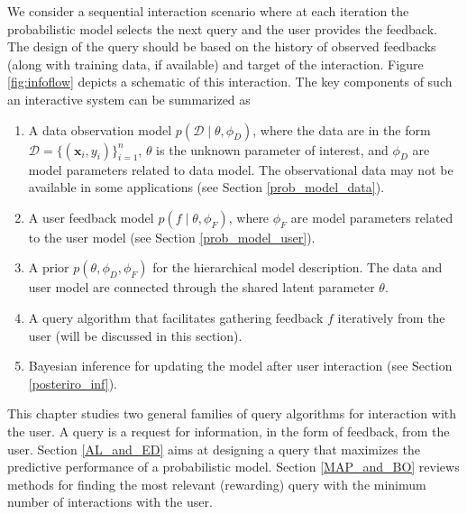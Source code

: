 \documentclass[dissertation,math,vertlayout,pdfa,colorlinks]{aaltoseries}
\newcommand{\bD}{\mathcal{D}}
\begin{document}
We consider a sequential interaction scenario where at each iteration the probabilistic model selects the next query and the user provides the feedback. The design of the query should be based on the history of observed feedbacks (along with training data, if available) and target of the interaction. Figure \ref{fig:infoflow} depicts a schematic of this interaction. The key components of such an interactive system can be summarized as

\begin{enumerate}
	\item A data observation model $p(\bD \mid \! \theta,\phi_D)$, where the data are in the form $\bD= \{(\bm{x}_i,y_i)\}_{i=1}^{n}$, $\theta$ is the unknown parameter of interest, and $\phi_D$ are model parameters related to data model. The observational data may not be available in some applications (see Section \ref{prob_model_data}). 
	\item A user feedback model $p(f\mid \theta, \phi_F)$, where $\phi_F$ are model parameters related to the user model (see Section \ref{prob_model_user}).
	\item A prior $p(\theta, \phi_D, \phi_F)$ for the hierarchical model description. The data and user model are connected through the shared latent parameter $\theta$.
	\item A query algorithm that facilitates gathering feedback $f$ iteratively from the user (will be discussed in this section).
	\item Bayesian inference for updating the model after user interaction (see Section \ref{posteriro_inf}).
\end{enumerate}

This chapter studies two general families of query algorithms for interaction with the user. A query is a request for information, in the form of feedback, from the user. Section \ref{AL_and_ED} aims at designing a query that maximizes the predictive performance of a probabilistic model. Section \ref{MAP_and_BO} reviews methods for finding the most relevant (rewarding) query with the minimum number of interactions with the user. 
\end{document}
